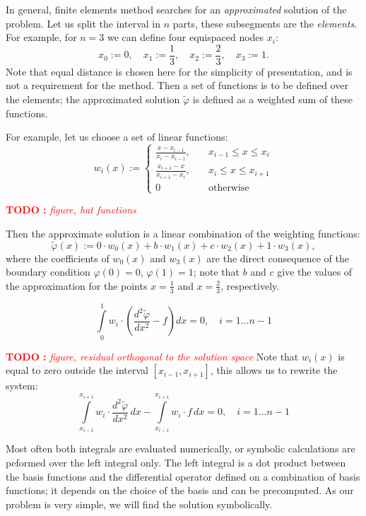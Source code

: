 \documentclass[notitlepage]{report}
\newcommand\TODO[1]{\textcolor{red}{{\bf TODO :} \it #1}}
\begin{document}
In general, finite elements method searches for an \textit{approximated} solution of the problem.
Let us split the interval in $n$ parts, these subsegments are the \textit{elements}.
For example, for $n=3$ we can define four equispaced nodes $x_i$:
$$
x_0 := 0, \quad x_1 := \frac{1}{3}, \quad x_2 := \frac{2}{3}, \quad x_3 := 1.
$$
Note that equal distance is chosen here for the simplicity of presentation, and is not a requirement for the method.
Then a set of functions is to be defined over the elements; the approximated solution $\tilde{\varphi}$ is defined as a weighted sum of these functions.

For example, let us choose a set of linear functions:
$$
w_i(x) := \left\{
\begin{split}
\frac{x-x_{i-1}}{x_i-x_{i-1}}, & \quad x_{i-1}\leq x \leq x_i \\
\frac{x_{i+1}-x}{x_{i+1}-x_i}, & \quad x_i\leq x \leq x_{i+1}\\
0 & \quad \text{otherwise}
\end{split}
\right.
$$

\TODO{figure, hat functions}

Then the approximate solution is a linear combination of the weighting functions:
$$
\tilde{\varphi}(x) := 0\cdot w_0(x) + b\cdot w_1(x) + c\cdot w_2(x) + 1\cdot w_3(x),
$$
where the coefficients of $w_0(x)$ and $w_3(x)$ are the direct consequence of the boundary condition $\varphi(0)=0$, $\varphi(1)=1$;
note that $b$ and $c$ give the values of the approximation for the points $x=\frac{1}{3}$ and $x=\frac{2}{3}$, respectively.

$$
\int\limits_0^1 w_i \cdot \left(\frac{d^2\tilde{\varphi}}{dx^2} - f\right) dx = 0, \quad i = 1\dots n-1 
$$

\TODO{figure, residual orthogonal to the solution space}
Note that $w_i(x)$ is equal to zero outside the interval $[x_{i-1}, x_{i+1}]$, this allows us to rewrite the system:
$$
\int\limits_{x_{i-1}}^{x_{i+1}} w_i \cdot \frac{d^2\tilde{\varphi}}{dx^2}\,dx - \int\limits_{x_{i-1}}^{x_{i+1}} w_i\cdot f\,dx = 0, \quad i = 1\dots n-1
$$

Most often both integrals are evaluated numerically, or symbolic calculations are peformed over the left integral only.
The left integral is a dot product between the basis functions and the differential operator defined on a combination of basis functions;
it depends on the choice of the basis and can be precomputed.
As our problem is very simple, we will find the solution symbolically.
\end{document}

